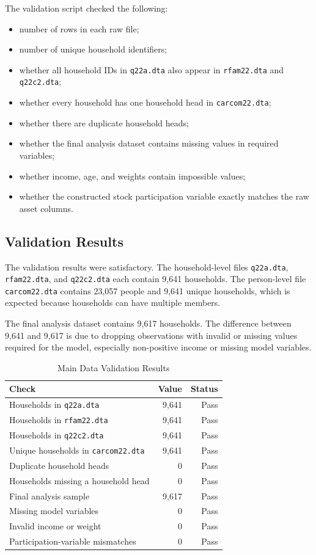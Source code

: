 \documentclass[12pt]{article}
\begin{document}
The validation script checked the following:

\begin{itemize}[leftmargin=*]
    \item number of rows in each raw file;
    \item number of unique household identifiers;
    \item whether all household IDs in \texttt{q22a.dta} also appear in \texttt{rfam22.dta} and \texttt{q22c2.dta};
    \item whether every household has one household head in \texttt{carcom22.dta};
    \item whether there are duplicate household heads;
    \item whether the final analysis dataset contains missing values in required variables;
    \item whether income, age, and weights contain impossible values;
    \item whether the constructed stock participation variable exactly matches the raw asset columns.
\end{itemize}

\subsection{Validation Results}

The validation results were satisfactory. The household-level files \texttt{q22a.dta}, \texttt{rfam22.dta}, and \texttt{q22c2.dta} each contain 9,641 households. The person-level file \texttt{carcom22.dta} contains 23,057 people and 9,641 unique households, which is expected because households can have multiple members.

The final analysis dataset contains 9,617 households. The difference between 9,641 and 9,617 is due to dropping observations with invalid or missing values required for the model, especially non-positive income or missing model variables.

\begin{table}[H]
\centering
\caption{Main Data Validation Results}
\begin{tabular}{lrr}
\toprule
\textbf{Check} & \textbf{Value} & \textbf{Status} \\
\midrule
Households in \texttt{q22a.dta} & 9,641 & Pass \\
Households in \texttt{rfam22.dta} & 9,641 & Pass \\
Households in \texttt{q22c2.dta} & 9,641 & Pass \\
Unique households in \texttt{carcom22.dta} & 9,641 & Pass \\
Duplicate household heads & 0 & Pass \\
Households missing a household head & 0 & Pass \\
Final analysis sample & 9,617 & Pass \\
Missing model variables & 0 & Pass \\
Invalid income or weight & 0 & Pass \\
Participation-variable mismatches & 0 & Pass \\
\bottomrule
\end{tabular}
\end{table}
\end{document}
